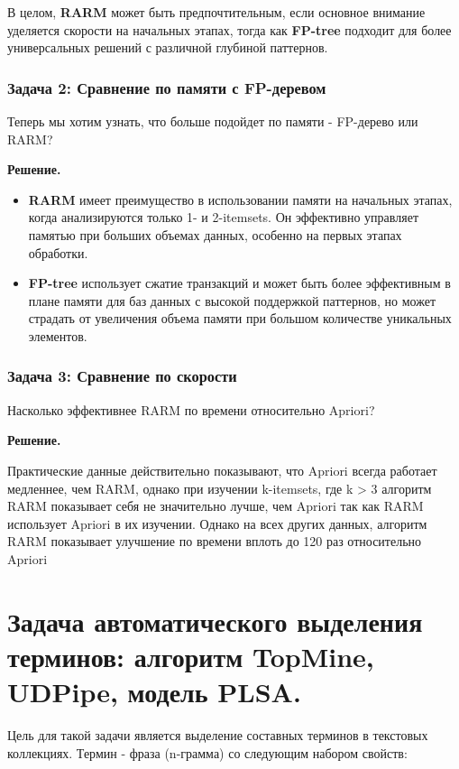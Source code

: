 В целом, \textbf{RARM} может быть предпочтительным, если основное внимание уделяется скорости на начальных этапах, тогда как \textbf{FP-tree} подходит для более универсальных решений с различной глубиной паттернов.


\subsubsection{Задача 2: Сравнение по памяти с FP-деревом} Теперь мы хотим узнать, что больше подойдет по памяти - FP-дерево или RARM?

\textbf{Решение.} 

\begin{itemize}
    \item \textbf{RARM} имеет преимущество в использовании памяти на начальных этапах, когда анализируются только 1- и 2-itemsets. Он эффективно управляет памятью при больших объемах данных, особенно на первых этапах обработки.
    \item \textbf{FP-tree} использует сжатие транзакций и может быть более эффективным в плане памяти для баз данных с высокой поддержкой паттернов, но может страдать от увеличения объема памяти при большом количестве уникальных элементов.
\end{itemize}

\subsubsection{Задача 3: Сравнение по скорости} Насколько эффективнее RARM по времени относительно Apriori?

\textbf{Решение.} 

Практические данные действительно показывают, что Apriori всегда работает медленнее, чем RARM, однако при изучении k-itemsets, где k > 3 алгоритм RARM показывает себя не значительно лучше, чем Apriori так как RARM использует Apriori в их изучении. Однако на всех других данных, алгоритм RARM показывает улучшение по времени вплоть до 120 раз относительно Apriori



\section{Задача автоматического выделения терминов: алгоритм TopMine, UDPipe, модель PLSA.}

Цель для такой задачи является выделение составных терминов в текстовых коллекциях. Термин - фраза (n-грамма) со следующим набором свойств:

